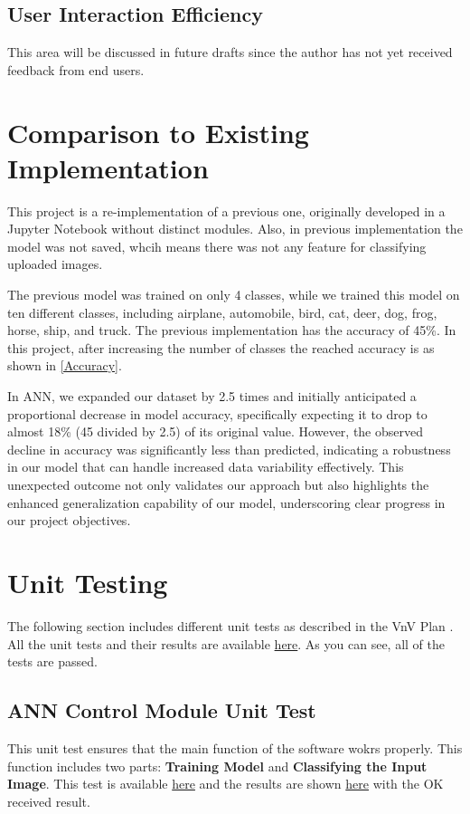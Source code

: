 \documentclass[12pt, titlepage]{article}
\begin{document}
\subsection{User Interaction Efficiency}

This area will be discussed in future drafts since the author has 
not yet received feedback from end users.

	
\section{Comparison to Existing Implementation}	
This project is a re-implementation of a previous one, originally developed in a 
Jupyter Notebook without distinct modules. Also, in previous implementation the model was not
saved, whcih means there was not any feature for classifying uploaded images. 

The previous model was trained on only 4 classes, while we trained this model 
on ten different classes, including airplane, 
automobile, bird, cat, deer, dog, frog, horse, ship, and truck. 
The previous implementation has the accuracy of 45\%. In this project, 
after increasing the number of classes the reached accuracy is as shown in 
\autoref{Accuracy}.

In ANN, we expanded our dataset by 2.5 times and initially 
anticipated a proportional decrease in model accuracy, specifically expecting it to 
drop to almost 18\% (45 divided by 2.5) of its original value. However, the observed 
decline in accuracy was significantly less than predicted, indicating a 
robustness in our model that can handle increased data variability effectively. 
This unexpected outcome not only validates our approach but also highlights the 
enhanced generalization capability of our model, underscoring clear progress in 
our project objectives. 
 
\section{Unit Testing}
The following section includes different unit tests as described in the VnV Plan \citep{VnVPlan}. 
All the unit tests and their results are available 
\href{https://github.com/tanya-jp/ANN-CAS741/tree/main/test}{here}. 
As you can see, all of the tests are passed.

\subsection{ ANN Control Module Unit Test}
This unit test ensures that the main function of the software wokrs properly.
This function includes two parts: \textbf{Training Model} and 
\textbf{Classifying the Input Image}. This test is available 
\href{https://github.com/tanya-jp/ANN-CAS741/blob/main/test/control_unit.py}{here} and 
the results are shown \href{https://github.com/tanya-jp/ANN-CAS741/blob/main/test/control_unit.log}{here} 
with the OK received result.
\end{document}
